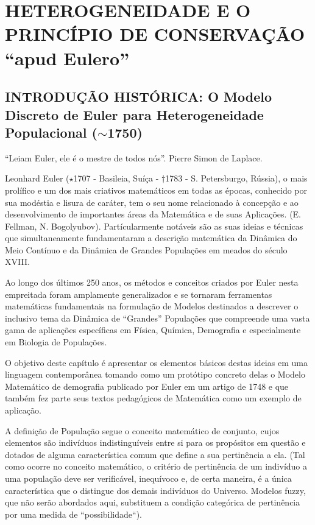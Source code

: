 \chapter{HETEROGENEIDADE E O PRINCÍPIO DE CONSERVAÇÃO ``apud Eulero''}



\section{INTRODUÇÃO HISTÓRICA: O Modelo Discreto de Euler para Heterogeneidade Populacional (\(\sim\)1750)}

\begin{citacao}
``Leiam Euler, ele é o mestre de todos nós''. Pierre Simon de Laplace.
\end{citacao}

Leonhard Euler (\(\star\)1707 - Basileia, Suíça - \(\dag\)1783 - S. Petersburgo, Rússia), o mais prolífico e um dos mais criativos matemáticos em todas as épocas, conhecido por sua modéstia e lisura de caráter, tem o seu nome relacionado à concepção e ao desenvolvimento de importantes áreas da Matemática e de suas Aplicações. (E. Fellman, N. Bogolyubov). Partícularmente notáveis são as suas ideias e técnicas que simultaneamente fundamentaram a descrição matemática da Dinâmica do Meio Contínuo e da Dinâmica de Grandes Populações em meados do século XVIII.

Ao longo dos últimos 250 anos, os métodos e conceitos criados por Euler nesta empreitada foram amplamente generalizados e se tornaram ferramentas matemáticas fundamentais na formulação de Modelos destinados a descrever o inclusivo tema da Dinâmica de ``Grandes'' Populações que compreende uma vasta gama de aplicações específicas em Física, Química, Demografia e especialmente em Biologia de Populações.

O objetivo deste capítulo é apresentar os elementos básicos destas ideias em uma linguagem contemporânea tomando como um protótipo concreto delas o Modelo Matemático de demografia publicado por Euler em um artigo de 1748 e que também fez parte seus textos pedagógicos de Matemática como um exemplo de aplicação.

A definição de População segue o conceito matemático de conjunto, cujos elementos são indivíduos indistinguíveis entre si para os propósitos em questão e dotados de alguma característica comum que define a sua pertinência a ela. {\small\color{red!50} (Tal como ocorre no conceito matemático, o critério de pertinência de um indivíduo a uma população deve ser verificável, inequívoco e, de certa maneira, é a única característica que o distingue dos demais indivíduos do Universo. Modelos fuzzy, que não serão abordados aqui, substituem a condição categórica de pertinência por uma medida de ``possibilidade``).}

